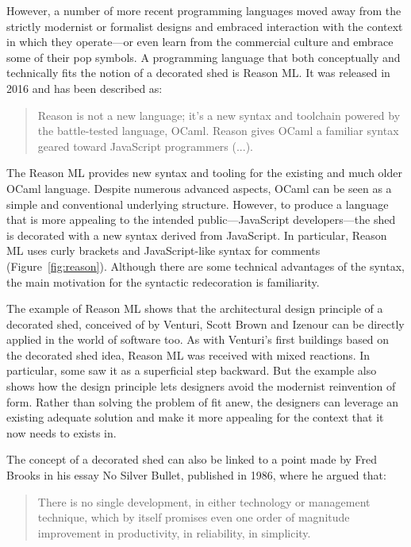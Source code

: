 However, a number of more recent programming languages moved away from the strictly modernist or
formalist designs and embraced interaction with the context in which they operate---or even learn
from the commercial culture and embrace some of their pop symbols. A programming language that
both conceptually and technically fits the notion of a decorated shed is Reason ML.
It was released in 2016 and has been described as:

\begin{quote}
Reason is not a new language; it's a new syntax and toolchain powered by the battle-tested
language, OCaml. Reason gives OCaml a familiar syntax geared toward JavaScript programmers
(...).
\end{quote}

The Reason ML provides new syntax and tooling for the existing and much older OCaml language.
Despite numerous advanced aspects, OCaml can be seen as a simple and conventional underlying
structure. However, to produce a language that is more appealing to the intended public---JavaScript
developers---the shed is decorated with a new syntax derived from JavaScript. In particular,
Reason ML uses curly brackets and JavaScript-like syntax for comments (Figure~\ref{fig:reason}).
Although there are some technical advantages of the syntax, the main motivation for the
syntactic redecoration is familiarity.

The example of Reason ML shows that the architectural design principle of a decorated shed,
conceived of by Venturi, Scott Brown and Izenour can be directly applied in the world of software
too. As with Venturi's first buildings based on the decorated shed idea, Reason ML was received with
mixed reactions. In particular, some saw it as a superficial step backward. But the example also
shows how the design principle lets designers avoid the modernist reinvention of form. Rather than
solving the problem of fit anew, the designers can leverage an existing adequate solution and make
it more appealing for the context that it now needs to exists in.

The concept of a decorated shed can also be linked to a point made by Fred Brooks in his essay
No Silver Bullet, published in 1986, where he argued that:

\begin{quote}
There is no single development, in either technology or management technique, which by itself
promises even one order of magnitude improvement in productivity, in reliability, in
simplicity.
\end{quote}

